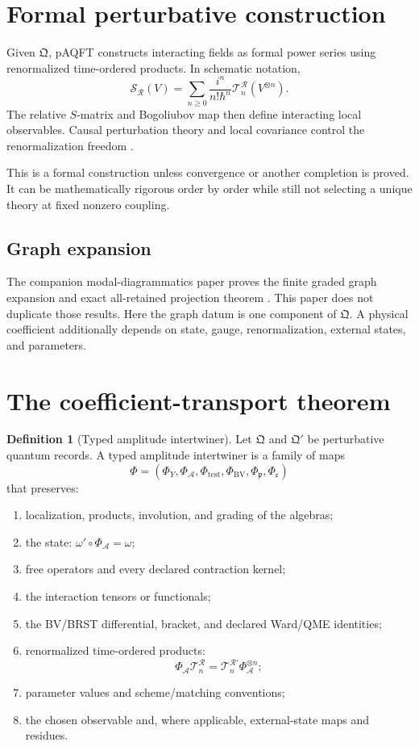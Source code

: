 \documentclass[11pt,a4paper]{article}
\numberwithin{equation}{section}
\theoremstyle{definition}
\newtheorem{definition}[theorem]{Definition}
\theoremstyle{remark}
\newcommand{\BV}{\mathrm{BV}}
\newcommand{\cA}{\mathcal A}
\newcommand{\cS}{\mathcal S}
\newcommand{\cT}{\mathcal T}
\newcommand{\cR}{\mathcal R}
\begin{document}
\section{Formal perturbative construction}

Given \(\mathfrak Q\), pAQFT constructs interacting fields as formal power
series using renormalized time-ordered products.  In schematic notation,
\[
 \cS_{\cR}(V)
 =
 \sum_{n\geq0}\frac{i^n}{n!\hbar^n}
 \cT_n^{\cR}(V^{\otimes n}).
\]
The relative \(S\)-matrix and Bogoliubov map then define interacting local
observables.  Causal perturbation theory and local covariance control the
renormalization freedom
\cite{BrunettiFredenhagen2000,HollandsWald2001}.

This is a formal construction unless convergence or another completion is
proved.  It can be mathematically rigorous order by order while still not
selecting a unique theory at fixed nonzero coupling.

\subsection{Graph expansion}

The companion modal-diagrammatics paper proves the finite graded graph
expansion and exact all-retained projection theorem
\cite{NeroDiagrammatics2026}.  This paper does not duplicate those
results.  Here the graph datum is one component of \(\mathfrak Q\).  A
physical coefficient additionally depends on state, gauge, renormalization,
external states, and parameters.

\section{The coefficient-transport theorem}

\begin{definition}[Typed amplitude intertwiner]
Let \(\mathfrak Q\) and \(\mathfrak Q'\) be perturbative quantum records.
A typed amplitude intertwiner is a family of maps
\[
\Phi=(\Phi_Y,\Phi_{\cA},\Phi_{\mathrm{test}},
\Phi_{\BV},\Phi_{\mathfrak p},\Phi_{\mathfrak c})
\]
that preserves:
\begin{enumerate}
\item localization, products, involution, and grading of the algebras;
\item the state: \(\omega' \circ \Phi_{\cA}=\omega\);
\item free operators and every declared contraction kernel;
\item the interaction tensors or functionals;
\item the BV/BRST differential, bracket, and declared Ward/QME identities;
\item renormalized time-ordered products:
\[
\Phi_{\cA}\cT_n^{\cR}
=
\cT_n^{\cR'}\Phi_{\cA}^{\otimes n};
\]
\item parameter values and scheme/matching conventions;
\item the chosen observable and, where applicable, external-state maps
and residues.
\end{enumerate}
\end{definition}
\end{document}
